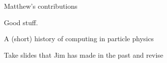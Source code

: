 \begin{frame}{Matthew's contributions}
\vspace{0.1 cm}

\Large
Good stuff.

\end{frame}

\begin{frame}{A (short) history of computing in particle physics}
\vspace{0.1 cm}

\Large
Take slides that Jim has made in the past and revise

\end{frame}
